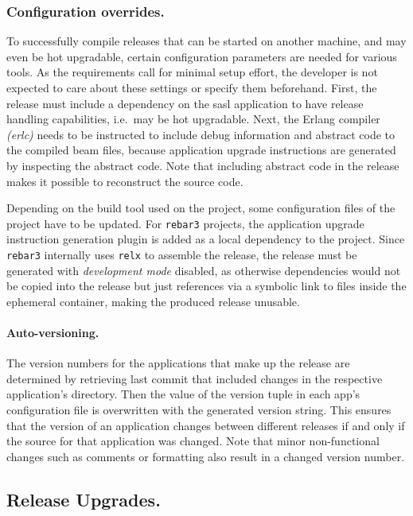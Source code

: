 \subsubsection{Configuration overrides.} To successfully compile releases that can be started on another machine, and may even be hot upgradable, certain configuration parameters are needed for various tools. As the requirements call for minimal setup effort, the developer is not expected to care about these settings or specify them beforehand. First, the release must include a dependency on the \acrfull{sasl} application to have release handling capabilities, i.e.~may be hot upgradable. Next, the Erlang compiler \emph{(erlc)} needs to be instructed to include debug information and abstract code to the compiled \acrshort{beam} files, because application upgrade instructions are generated by inspecting the abstract code. Note that including abstract code in the release makes it possible to reconstruct the source code.

Depending on the build tool used on the project, some configuration files of the project have to be updated. For \lstinline|rebar3| projects, the application upgrade instruction generation plugin is added as a local dependency to the project. Since \lstinline|rebar3| internally uses \lstinline|relx| to assemble the release, the release must be generated with \emph{development mode} disabled, as otherwise dependencies would not be copied into the release but just references via a symbolic link to files inside the ephemeral container, making the produced release unusable.

\paragraph{Auto-versioning.} The version numbers for the applications that make up the release are determined by retrieving last commit that included changes in the respective application's directory. Then the value of the version tuple in each app's configuration file is overwritten with the generated version string. This ensures that the version of an application changes between different releases if and only if the source for that application was changed. Note that minor non-functional changes such as comments or formatting also result in a changed version number.

\subsection{Release Upgrades.}

